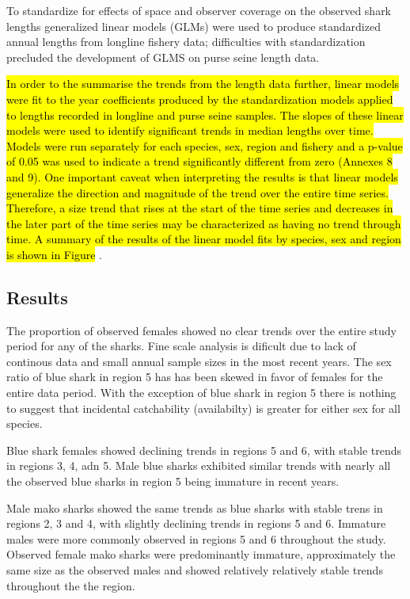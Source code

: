 \documentclass[12pt]{SCreport}
\begin{document}
To standardize for effects of space and observer coverage on the observed shark lengths generalized linear models (GLMs) were used to produce standardized annual lengths from longline fishery data; difficulties with standardization precluded the development of GLMS on purse seine length data. 

\hl{In order to the summarise the trends from the length data further, linear models were fit to the year
coefficients produced by the standardization models applied to lengths recorded in longline and purse
seine samples. The slopes of these linear models were used to identify significant trends in median
lengths over time. Models were run separately for each species, sex, region and fishery and a p-value of
0.05 was used to indicate a trend significantly different from zero (Annexes 8 and 9). One important
caveat when interpreting the results is that linear models generalize the direction and magnitude of the
trend over the entire time series. Therefore, a size trend that rises at the start of the time series and
decreases in the later part of the time series may be characterized as having no trend through time. A
summary of the results of the linear model fits by species, sex and region is shown in Figure }.


\subsection{Results}
    The proportion of observed females showed no clear trends over the entire study period for any of the sharks.  Fine scale analysis is dificult due to lack of continous data and small annual sample sizes in the most recent years.   The sex ratio of blue shark in region 5 has has been skewed in favor of females for the entire data period. With the exception of blue shark in region 5 there is nothing to suggest that   incidental catchability (availabilty) is greater for either sex for all species.
    
Blue shark females showed declining trends in regions 5 and 6, with stable trends in regions 3, 4, adn 5. Male blue sharks exhibited similar trends with nearly all the observed blue sharks in region 5 being immature in recent years. 

Male mako sharks showed the same trends as blue sharks with stable trens in  regions 2, 3 and 4, with slightly declining trends in regions 5 and 6. Immature males were more commonly observed in regions 5 and 6 throughout the study.  Observed female mako sharks were predominantly immature, approximately the same size as the observed males and showed relatively relatively stable trends throughout the the region.
\end{document}

